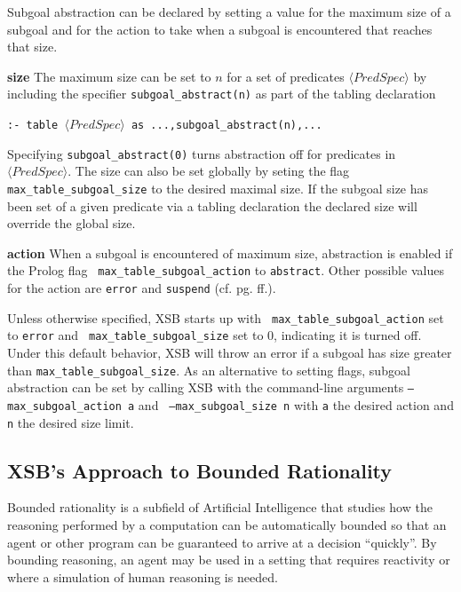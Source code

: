 
Subgoal abstraction can be declared by setting a value for the maximum
size of a subgoal and for the action to take when a subgoal is
encountered that reaches that size.
%
\bi
\item {\bf size} The maximum size can be set to $n$ for a set of
  predicates $\langle PredSpec \rangle$ by including the specifier
  {\tt subgoal\_abstract(n)} as part of the tabling declaration

{\tt :- table $\langle PredSpec\rangle$  as ...,subgoal\_abstract(n),...}

  Specifying {\tt subgoal\_abstract(0)} turns abstraction off for
  predicates in $\langle PredSpec \rangle$.  The size can also be set
  globally by seting the flag {\tt max\_table\_subgoal\_size} to the
  desired maximal size.  If the subgoal size has been set of a given
  predicate via a tabling declaration the declared size will override
  the global size.

\item {\bf action} When a subgoal is encountered of maximum size,
  abstraction is enabled if the Prolog flag {\tt
    max\_table\_subgoal\_action} to {\tt abstract}.  Other possible
  values for the action are {\tt error} and {\tt suspend}
  (cf. pg. \pageref{prolog-flags} ff.).  \ei

\noindent
Unless otherwise specified, XSB starts up with {\tt
  max\_table\_subgoal\_action} set to {\tt error} and {\tt
  max\_table\_subgoal\_size} set to 0, indicating it is turned off.
Under this default behavior, XSB will throw an error if a subgoal has
size greater than {\tt max\_table\_subgoal\_size}.  As an alternative
to setting flags, subgoal abstraction can be set by calling XSB with
the command-line arguments {\tt --max\_subgoal\_action a} and {\tt
  --max\_subgoal\_size n} with {\tt a} the desired action and {\tt n}
the desired size limit.

\subsection{XSB's Approach to Bounded Rationality} \label{sec:restraint}
%
Bounded rationality is a subfield of Artificial Intelligence that
studies how the reasoning performed by a computation can be
automatically bounded so that an agent or other program can be
guaranteed to arrive at a decision ``quickly''.  By bounding
reasoning, an agent may be used in a setting that requires reactivity
or where a simulation of human reasoning is needed.

